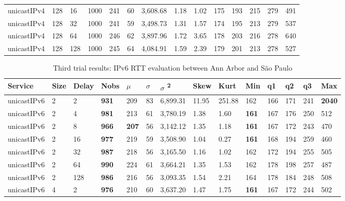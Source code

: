 \begin{table}[!htb]
\begin{tabular}{@{}llllllllllllll@{}}
unicastIPv4 & 128          & 16    & 1000 & 241  & 60  & 3,608.68 & 1.18     & 1.02     & 175 & 193 & 215 & 279 & 491  \\
unicastIPv4 & 128          & 32    & 1000 & 241  & 59  & 3,498.73 & 1.31     & 1.57     & 174 & 195 & 213 & 279 & 537  \\
unicastIPv4 & 128          & 64    & 1000 & 246  & 62  & 3,897.96 & 1.72     & 3.65     & 178 & 203 & 216 & 278 & 640  \\
unicastIPv4 & 128          & 128   & 1000 & 245  & 64  & 4,084.91 & 1.59     & 2.39     & 179 & 201 & 213 & 278 & 527  \\ \bottomrule
\end{tabular}
\end{table}



\begin{table}[!htb]
\centering
\caption{Third trial results: IPv6 RTT evaluation between Ann Arbor and São Paulo}
\label{tab:thirdtrialarbsaoipv6}
\begin{tabular}{@{}llllllllllllll@{}}
\toprule
Service    & Size & Delay & Nobs & $\mu$ & $\sigma$  & $\sigma$ \textsuperscript{2} & Skew & Kurt & Min & q1   & q2   & q3   & Max   \\ \midrule
unicastIPv6 & 2            & 2     & \textbf{931}  & 209  & 83  & 6,899.31 & 11.95    & 251.88   & 162 & 166 & 171 & 241 & \textbf{2040} \\
unicastIPv6 & 2            & 4     & \textbf{981}  & 213  & 61  & 3,780.19 & 1.38     & 1.60     & \textbf{161} & 167 & 176 & 250 & 512  \\
unicastIPv6 & 2            & 8     & \textbf{966}  & \textbf{207}  & 56  & 3,142.12 & 1.35     & 1.18     & \textbf{161} & 167 & 172 & 243 & 470  \\
unicastIPv6 & 2            & 16    & \textbf{977}  & 219  & 59  & 3,508.90 & 1.04     & 0.27     & \textbf{161} & 168 & 194 & 259 & 460  \\
unicastIPv6 & 2            & 32    & \textbf{987}  & 218  & 56  & 3,165.50 & 1.16     & 1.02     & 162 & 172 & 194 & 255 & 505  \\
unicastIPv6 & 2            & 64    & \textbf{990}  & 224  & 61  & 3,664.21 & 1.35     & 1.53     & 162 & 178 & 198 & 257 & 487  \\
unicastIPv6 & 2            & 128   & \textbf{986}  & 216  & 56  & 3,093.35 & 1.54     & 2.21     & 164 & 178 & 184 & 248 & 508  \\ \hline
unicastIPv6 & 4            & 2     & \textbf{976}  & 210  & 60  & 3,637.20 & 1.47     & 1.75     & \textbf{161} & 167 & 172 & 244 & 502  \\

\end{tabular}
\end{table}
